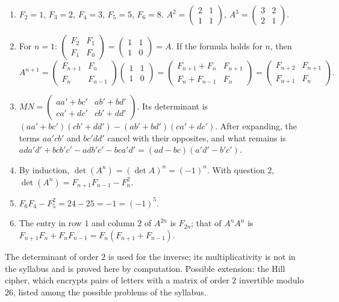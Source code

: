 \begin{solution}[Problem]
\begin{enumerate}
\item $F_2=1$, $F_3=2$, $F_4=3$, $F_5=5$, $F_6=8$. $A^2=\begin{pmatrix}2&1\\1&1\end{pmatrix}$, $A^3=\begin{pmatrix}3&2\\2&1\end{pmatrix}$.
\item For $n=1$: $\begin{pmatrix}F_2&F_1\\F_1&F_0\end{pmatrix}=\begin{pmatrix}1&1\\1&0\end{pmatrix}=A$. If the formula holds for $n$, then
\[A^{n+1}=\begin{pmatrix}F_{n+1}&F_n\\F_n&F_{n-1}\end{pmatrix}\begin{pmatrix}1&1\\1&0\end{pmatrix}=\begin{pmatrix}F_{n+1}+F_n&F_{n+1}\\F_n+F_{n-1}&F_n\end{pmatrix}=\begin{pmatrix}F_{n+2}&F_{n+1}\\F_{n+1}&F_n\end{pmatrix}.\]
\item $MN=\begin{pmatrix}aa'+bc'&ab'+bd'\\ca'+dc'&cb'+dd'\end{pmatrix}$. Its determinant is $(aa'+bc')(cb'+dd')-(ab'+bd')(ca'+dc')$. After expanding, the terms $aa'cb'$ and $bc'dd'$ cancel with their opposites, and what remains is $ada'd'+bcb'c'-adb'c'-bca'd'=(ad-bc)(a'd'-b'c')$.
\item By induction, $\det\left(A^n\right)=(\det A)^n=(-1)^n$. With question 2, $\det\left(A^n\right)=F_{n+1}F_{n-1}-F_n^2$.
\item $F_6F_4-F_5^2=24-25=-1=(-1)^5$.
\item The entry in row $1$ and column $2$ of $A^{2n}$ is $F_{2n}$; that of $A^nA^n$ is $F_{n+1}F_n+F_nF_{n-1}=F_n\left(F_{n+1}+F_{n-1}\right)$.
\end{enumerate}
\end{solution}
\begin{teachernote}
The determinant of order $2$ is used for the inverse; its multiplicativity is not in the syllabus and is proved here by computation. Possible extension: the Hill cipher, which encrypts pairs of letters with a matrix of order $2$ invertible modulo $26$, listed among the possible problems of the syllabus.
\end{teachernote}
